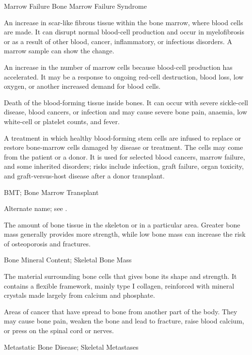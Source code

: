 \synonyms
Marrow Failure
Bone Marrow Failure Syndrome

 An increase in scar-like fibrous tissue
  within the bone marrow, where blood cells are made. It can disrupt
  normal blood-cell production and occur in myelofibrosis or as a result
  of other blood, cancer, inflammatory, or infectious disorders. A marrow
  sample can show the change.

 An increase in the number of marrow cells because blood-cell production has accelerated. It may be a response to ongoing red-cell destruction, blood loss, low oxygen, or another increased demand for blood cells.

 Death of the blood-forming tissue inside bones. It can occur with severe sickle-cell disease, blood cancers, or infection and may cause severe bone pain, anaemia, low white-cell or platelet counts, and fever.

 A treatment in which healthy blood-forming stem cells are infused to replace or restore bone-marrow cells damaged by disease or treatment. The cells may come from the patient or a donor. It is used for selected blood cancers, marrow failure, and some inherited disorders; risks include infection, graft failure, organ toxicity, and graft-versus-host disease after a donor transplant.

\synonyms
BMT; Bone Marrow Transplant

 Alternate name; see .

 The amount of bone tissue in the skeleton or in a particular area. Greater bone mass generally provides more strength, while low bone mass can increase the risk of osteoporosis and fractures.

\synonyms
Bone Mineral Content; Skeletal Bone Mass

 The material surrounding bone cells that gives bone its shape and strength. It contains a flexible framework, mainly type I collagen, reinforced with mineral crystals made largely from calcium and phosphate.

 Areas of cancer that have spread to bone from another part of the body. They may cause bone pain, weaken the bone and lead to fracture, raise blood calcium, or press on the spinal cord or nerves.

\synonyms
Metastatic Bone Disease; Skeletal Metastases

